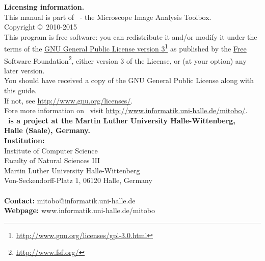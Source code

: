 \documentclass[11pt,a4paper,english]{report}
\begin{document}
\newpage
\thispagestyle{empty}
\parindent0pt
{\large \textbf{Licensing information.}}\\[0.5cm]
This manual is part of \mitobo\ - the Microscope Image Analysis
Toolbox.\\[0.5cm]
Copyright \copyright\ 2010-2015\\[0.5cm]
This program is free software: you can redistribute it and/or modify
it under the terms of the \href{http://www.gnu.org/licenses/gpl-3.0.html}{GNU
General Public License
version
3}\footnote{\href{http://www.gnu.org/licenses/gpl-3.0.html}{http://www.gnu.org/licenses/gpl-3.0.html}}
as published by the \href{http://www.fsf.org/}{Free Software
Foundation}\footnote{\href{http://www.fsf.org/}{http://www.fsf.org/}}, either
version 3 of the License, or (at your option) any later version.\\ 
You should have received a copy of the GNU General Public License along with this guide.\\
If not,
see \href{http://www.gnu.org/licenses/}{http://www.gnu.org/licenses/}.\\[1.0cm]
Fore more information on \mitobo\ visit
\href{http://www.informatik.uni-halle.de/mitobo/}{
http://www.informatik.uni-halle.de/mitobo/}.\\[5.0cm] 

{\large \textbf{\mitobo\ is a project at the Martin Luther University
Halle-Wittenberg, \\ Halle (Saale), Germany.}}\\[0.5cm]

\textbf{Institution:}\\[0.5cm]
Institute of Computer Science\\
Faculty of Natural Sciences III\\
Martin Luther University Halle-Wittenberg\\
Von-Seckendorff-Platz 1, 06120 Halle, Germany\\\\
\textbf{Contact:} mitobo@informatik.uni-halle.de\\
\textbf{Webpage:} www.informatik.uni-halle.de/mitobo
\parindent20pt
\newpage
{}


\tableofcontents




\end{document}
